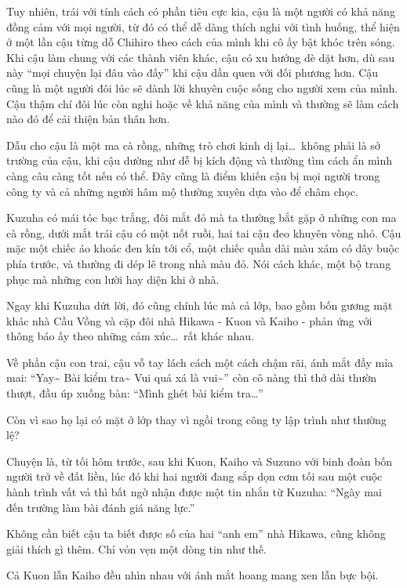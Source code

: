\documentclass[../main.tex]{subfiles}
\begin{document}
Tuy nhiên, trái với tính cách có phần tiêu cực kia, cậu là một người có khả năng đồng cảm với mọi người, từ đó có thể dễ dàng thích nghi với tình huống, thể hiện ở một lần cậu từng dỗ Chihiro theo cách của mình khi cô ấy bật khóc trên sóng. Khi cậu làm chung với các thành viên khác, cậu có xu hướng dè dặt hơn, dù sau này ``mọi chuyện lại đâu vào đấy'' khi cậu dần quen với đối phương hơn. Cậu cũng là một người đôi lúc sẽ dành lời khuyên cuộc sống cho người xem của mình. Cậu thậm chí đôi lúc còn nghi hoặc về khả năng của mình và thường sẽ làm cách nào đó để cải thiện bản thân hơn.

Dẫu cho cậu là một ma cà rồng, những trò chơi kinh dị lại\dots\ không phải là sở trường của cậu, khi cậu dường như dễ bị kích động và thường tìm cách ẩn mình càng câu càng tốt nếu có thể. Đây cũng là điểm khiến cậu bị mọi người trong công ty và cả những người hâm mộ thường xuyên dựa vào để châm chọc.

Kuzuha có mái tóc bạc trắng, đôi mắt đỏ mà ta thường bắt gặp ở những con ma cà rồng, dưới mắt trái cậu có một nốt ruồi, hai tai cậu đeo khuyên vòng nhỏ. Cậu mặc một chiếc áo khoác đen kín tới cổ, một chiếc quần dài màu xám có dây buộc phía trước, và thường đi dép lê trong nhà màu đỏ. Nói cách khác, một bộ trang phục mà những con lười hay diện khi ở nhà.

\chrint

Ngay khi Kuzuha dứt lời, đó cũng chính lúc mà cả lớp, bao gồm bốn gương mặt khác nhà Cầu Vồng và cặp đôi nhà Hikawa - Kuon và Kaiho - phản ứng với thông báo ấy theo những cảm xúc\dots\ rất khác nhau.


Về phần cậu con trai, cậu vỗ tay lách cách một cách chậm rãi, ánh mắt đầy mỉa mai: ``Yay\~{} Bài kiểm tra\~{} Vui quá xá là vui\~{}'' còn cô nàng thì thở dài thườn thượt, đầu úp xuống bàn: ``Mình ghét bài kiểm tra\dots''

Còn vì sao họ lại có mặt ở lớp thay vì ngồi trong công ty lập trình như thường lệ?

Chuyện là, từ tối hôm trước, sau khi Kuon, Kaiho và Suzuno với binh đoàn bốn người trở về đất liền, lúc đó khi hai người đang sắp dọn cơm tối sau một cuộc hành trình vất vả thì bất ngờ nhận được một tin nhắn từ Kuzuha: ``Ngày mai đến trường làm bài đánh giá năng lực.''

Không cần biết cậu ta biết được số của hai ``anh em'' nhà Hikawa, cũng không giải thích gì thêm. Chỉ vỏn vẹn một dòng tin như thế.

Cả Kuon lẫn Kaiho đều nhìn nhau với ánh mắt hoang mang xen lẫn bực bội.
\end{document}
